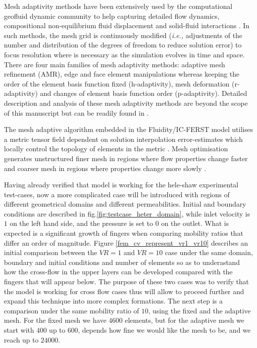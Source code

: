 \documentclass[preprint,authoryear,12pt]{elsarticle}
\newcommand{\ie}{{\it i.e., }}
\begin{document}
\medskip
Mesh adaptivity methods have been extensively used by the computational geofluid dynamic community to help capturing detailed flow dynamics, compositional non-equilibrium fluid displacement and solid-fluid interactions \citep{pluszny_2007,pietro_2014,su_2016,melnikova_2016}. In such methods, the mesh grid is continuously modified (\ie adjustments of the number and distribution of the degrees of freedom to reduce solution error) to focus resolution where is necessary as the simulation evolves in time and space. There are four main families of mesh adaptivity methods: adaptive mesh refinement (AMR), edge and face element manipulations whereas keeping the order of the element basis function fixed (h-adaptivity), mesh deformation (r-adaptivity) and changes of element basis function order (p-adaptivity). Detailed description and analysis of these mesh adaptivity methods are beyond the scope of this manuscript but can be readily found in \citet{lo_book} \citep[see also][]{plewa_book,frey_book}.  

\medskip
The mesh adaptive algorithm embedded in the Fluidity/IC-FERST model utilises a metric tensor field dependent on solution interpolation error-estimates which locally control the topology of elements in the metric \citep{pain_2001,power_2006}. Mesh optimisation generates unstructured finer mesh in regions where flow properties change faster and coarser mesh in regions where properties change more slowly \citep{piggott_2006}.

\medskip
Having already verified that model is working for the hele-shaw experimental test-cases, now a more complicated case will be introduced with regions of different geometrical domains and different permeabilities. Initial and boundary conditions are described in fig.\ref{fig:testcase_heter_domain}, while inlet velocity is $1$ on the left hand side, and the pressure is set to $0$ on the outlet. What is expected is a significant growth of fingers when comparing mobility ratios that differ an order of magnitude. 
Figure \ref{fem_cv_represent_vr1_vr10} describes an initial comparison between the $VR=1$ and $VR=10$ case under the same domain, boundary and initial conditions and number of elements so as to underastand how the cross-flow in the upper layers can be developed compared with the fingers that will appear below. The purpose of these two cases was to verify that the model is working for cross flow cases thus will allow to proceed further and expand this technique into more complex formations. The next step is a comparison under the same mobility ratio of $10$, using the fixed and the adaptive mesh. For the fixed mesh we have $4600$ elements, but for the adaptive mesh we start with $400$ up to $600$, depends how fine we would like the mesh to be, and we reach up to $24000$. %
\end{document}
